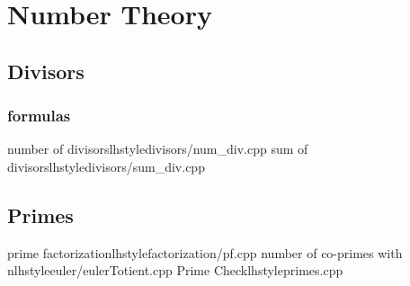 \section{Number Theory}
    \subsection{Divisors}
       \subsubsection{formulas}
            {number of divisors}{lhstyle}{divisors/num_div.cpp}
            {sum of divisors}{lhstyle}{divisors/sum_div.cpp}
    \subsection{Primes}
         {prime factorization}{lhstyle}{factorization/pf.cpp}
         {number of co-primes with n}{lhstyle}{euler/eulerTotient.cpp}
         {Prime Check}{lhstyle}{primes.cpp}
